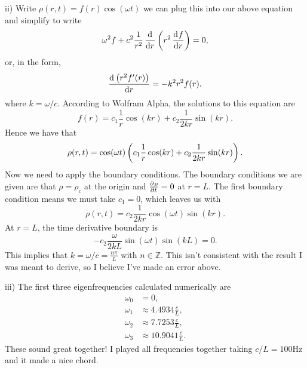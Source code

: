 \documentclass{article}
\newcommand{\Z}{\mathbb{Z}}
\begin{document}
ii) Write $\rho(r, t) = f(r) \cos(\omega t)$ we can plug this into our
above equation and simplify to write
%
\begin{equation*}
    \omega^2 f + c^2 \frac{1}{r^2} \dod{}{r} \del{r^2 \dod{f}{r}} = 0
    ,
\end{equation*}
%
or, in the form,
%
\begin{equation*}
    \dod{\del{r^2 f^\prime(r)}}{r} = - k^2 r^2 f(r)
    .
\end{equation*}
%
where $k = \omega / c$. According to Wolfram Alpha, the solutions to
this equation are
%
\begin{equation*}
    f(r) = c_1 \frac{1}{r} \cos(k r) + c_2 \frac{1}{2 k r} \sin(k r)
    .
\end{equation*}
%
Hence we have that
%
\begin{equation*}
    \rho(r, t) = \cos(\omega t) \del{c_1 \frac{1}{r} \cos(k r) + c_2 \frac{1}{2 k r} \sin(k r)}
    .
\end{equation*}
%
Now we need to apply the boundary conditions. The boundary conditions we
are given are that $\rho = \rho_c$ at the origin and $\pd{\rho}{t} = 0$
at $r = L$. The first boundary condition means we must take $c_1 = 0$,
which leaves us with
%
\begin{equation*}
    \rho(r, t) = c_2 \frac{1}{2 k r} \cos(\omega t) \sin(k r)
    .
\end{equation*}
%
At $r = L$, the time derivative boundary is
%
\begin{equation*}
    - c_2 \frac{\omega}{2 k L} \sin(\omega t) \sin(k L) = 0
    .
\end{equation*}
%
This implies that $k = \omega / c = \frac{n \pi}{L}$ with $n \in \Z$.
This isn't consistent with the result I was meant to derive, so
I believe I've made an error above.

iii) The first three eigenfrequencies calculated numerically are
%
\begin{align*}
    \omega_0 &= 0, \\
    \omega_1 &\approx 4.4934 \frac{c}{L}, \\
    \omega_2 &\approx 7.7253 \frac{c}{L}, \\
    \omega_3 &\approx 10.9041 \frac{c}{L}
    .
\end{align*}
%
These sound great together! I played all frequencies together taking $c
/ L = 100 \text{Hz}$ and it made a nice chord.
\end{document}

